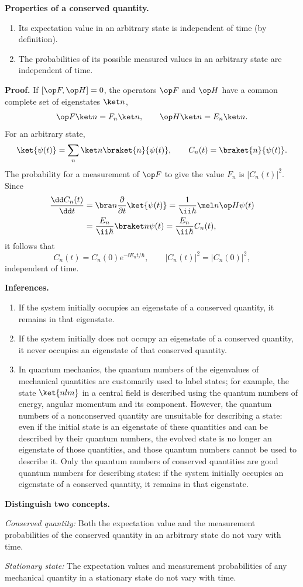 \textbf{Properties of a conserved quantity.}
\begin{enumerate}[label=\alph*)]
\item Its expectation value in an arbitrary state is independent of time (by definition).
\item The probabilities of its possible measured values in an arbitrary state are independent of time.
\end{enumerate}
\textbf{Proof.} If $[\op F,\op H]=0$, the operators $\op F$ and $\op H$ have a common complete set of eigenstates $\ket n$,
\[\op F\ket n=F_n\ket n,\qquad \op H\ket n=E_n\ket n.\]
For an arbitrary state,
\[\ket{\psi(t)}=\sum_n\ket n\braket{n}{\psi(t)},\qquad
C_n(t)=\braket{n}{\psi(t)}.\]
The probability for a measurement of $\op F$ to give the value $F_n$ is $|C_n(t)|^2$. Since
\begin{align*}
\frac{\dd C_n(t)}{\dd t}
&=\bra n\frac{\partial}{\partial t}\ket{\psi(t)}
=\frac1{\ii\hbar}\mel n{\op H}{\psi(t)}\\
&=\frac{E_n}{\ii\hbar}\braket n{\psi(t)}
=\frac{E_n}{\ii\hbar}C_n(t),
\end{align*}
it follows that
\[C_n(t)=C_n(0)e^{-\ii E_nt/\hbar},\qquad
|C_n(t)|^2=|C_n(0)|^2,\]
independent of time.

\textbf{Inferences.}
\begin{enumerate}[label=\alph*)]
\item If the system initially occupies an eigenstate of a conserved quantity, it remains in that eigenstate.
\item If the system initially does not occupy an eigenstate of a conserved quantity, it never occupies an eigenstate of that conserved quantity.
\item In quantum mechanics, the quantum numbers of the eigenvalues of mechanical quantities are customarily used to label states; for example, the state $\ket{nlm}$ in a central field is described using the quantum numbers of energy, angular momentum and its component. However, the quantum numbers of a nonconserved quantity are unsuitable for describing a state: even if the initial state is an eigenstate of these quantities and can be described by their quantum numbers, the evolved state is no longer an eigenstate of those quantities, and those quantum numbers cannot be used to describe it. Only the quantum numbers of conserved quantities are good quantum numbers for describing states: if the system initially occupies an eigenstate of a conserved quantity, it remains in that eigenstate.
\end{enumerate}

\textbf{Distinguish two concepts.}

\emph{Conserved quantity:} Both the expectation value and the measurement probabilities of the conserved quantity in an arbitrary state do not vary with time.

\emph{Stationary state:} The expectation values and measurement probabilities of any mechanical quantity in a stationary state do not vary with time.